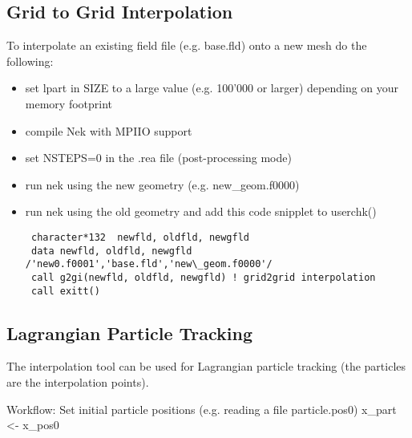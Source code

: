 \subsection{Grid to Grid Interpolation}

To interpolate an existing field file (e.g. base.fld) onto a new mesh do the following:
\begin{itemize}
\item set lpart in SIZE to a large value (e.g. 100'000 or larger) depending on your memory footprint
\item    compile Nek with MPIIO support
\item    set NSTEPS=0 in the .rea file (post-processing mode)
\item    run nek using the new geometry (e.g. new\_geom.f0000)
\item    run nek using the old geometry and add this code snipplet to userchk() 
\begin{verbatim}
 character*132  newfld, oldfld, newgfld
 data newfld, oldfld, newgfld /'new0.f0001','base.fld','new\_geom.f0000'/
 call g2gi(newfld, oldfld, newgfld) ! grid2grid interpolation
 call exitt()
\end{verbatim}
\end{itemize}
    

\subsection{Lagrangian Particle Tracking}

The interpolation tool can be used for Lagrangian particle tracking (the particles are the interpolation points).

Workflow: Set initial particle positions (e.g. reading a file particle.pos0) x\_part <- x\_pos0 

